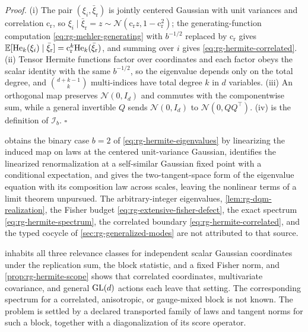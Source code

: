 \noindent\emph{Proof.}
(i) The pair \((\xi_i,\bar\xi_{\mathrm r})\) is jointly centered Gaussian with unit variances and
correlation \(\mathrm c_{\mathrm r}\), so
\(\xi_i\mid \bar\xi_{\mathrm r}=z\sim \mathcal N(\mathrm c_{\mathrm r} z,1-\mathrm c_{\mathrm r}^2)\); the
generating-function computation \eqref{eq:rg-mehler-generating} with
\(b^{-1/2}\) replaced by \(\mathrm c_{\mathrm r}\) gives
\(\mathbb E[\mathrm{He}_k(\xi_i)\mid \bar\xi_{\mathrm r}]=\mathrm c_{\mathrm r}^k\mathrm{He}_k(\bar\xi_{\mathrm r})\), and
summing over \(i\) gives \eqref{eq:rg-hermite-correlated}. (ii) Tensor Hermite
functions factor over coordinates and each factor obeys the scalar identity
with the same \(b^{-1/2}\), so the eigenvalue depends only on the total degree,
and \(\binom{d+k-1}{k}\) multi-indices have total degree \(k\) in \(d\)
variables. (iii) An orthogonal map preserves \(\mathcal N(0,I_d)\) and commutes with the
componentwise sum, while a general invertible \(Q\) sends \(\mathcal N(0,I_d)\) to
\(\mathcal N(0,QQ^\top)\). (iv) is the definition of \(\mathscr I_b\). \(\square\)

\citet[Sections~2, 5 and~7]{JonaLasinio2001} obtains the binary case \(b=2\)
of \eqref{eq:rg-hermite-eigenvalues} by linearizing the induced map on laws at
the centered unit-variance Gaussian, identifies the linearized renormalization
at a self-similar Gaussian fixed point with a conditional expectation, and
gives the two-tangent-space form of the eigenvalue equation with its
composition law across scales, leaving the nonlinear terms of a limit theorem
unpursued. The arbitrary-integer eigenvalues, \cref{lem:rg-dqm-realization},
the Fisher budget \eqref{eq:rg-extensive-fisher-defect}, the exact spectrum
\eqref{eq:rg-hermite-spectrum}, the correlated boundary
\eqref{eq:rg-hermite-correlated}, and the typed cocycle of
\cref{sec:rg-generalized-modes} are not attributed to that source.

 inhabits all three relevance classes for
independent scalar Gaussian coordinates under the replication sum, the block
statistic, and a fixed Fisher norm, and \cref{prop:rg-hermite-scope} shows
that correlated coordinates, multivariate covariance, and general \(\mathrm{GL}(d)\)
actions each leave that setting. The corresponding spectrum for a correlated,
anisotropic, or gauge-mixed block is not known. The problem is settled by a
declared transported family of laws and tangent norms for such a block,
together with a diagonalization of its score operator.

